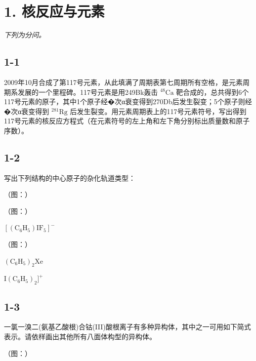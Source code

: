 \section*{1. 核反应与元素}
\textit{下列为分问。}

\subsection*{1-1}
2009年10⽉合成了第117号元素，从此填满了周期表第七周期所有空格，是元素周期系发展的⼀个⾥程碑。117号元素是⽤249Bk轰击 $^ { 4 8 } \mathrm { C a }$ 靶合成的，总共得到6个117号元素的原⼦，其中1个原⼦经�次α衰变得到270Db后发⽣裂变；5个原⼦则经�次α衰变得到 $^ { 2 8 1 } \mathrm { R g }$ 后发⽣裂变。⽤元素周期表上的117号元素符号，写出得到117号元素的核反应⽅程式（在元素符号的左上⻆和左下⻆分别标出质量数和原⼦序数）。

\subsection*{1-2}
写出下列结构的中⼼原⼦的杂化轨道类型：

（图：）

（图：）

$
[ (\mathrm{C} _ {6} \mathrm{H} _ {5}) \mathrm{IF} _ {5} ] ^ {-}
$

（图：）

$
(\mathrm{C} _ {6} \mathrm{H} _ {5}) _ {2} \mathrm{Xe}
$

$
\mathrm{I} (\mathrm{C} _ {6} \mathrm{H} _ {5}) _ {2} ] ^ {+}
$

\subsection*{1-3}
⼀氯⼀溴⼆(氨基⼄酸根)合钴(III)酸根离⼦有多种异构体，其中之⼀可⽤如下简式表⽰。请依样画出其他所有⼋⾯体构型的异构体。

（图：）
